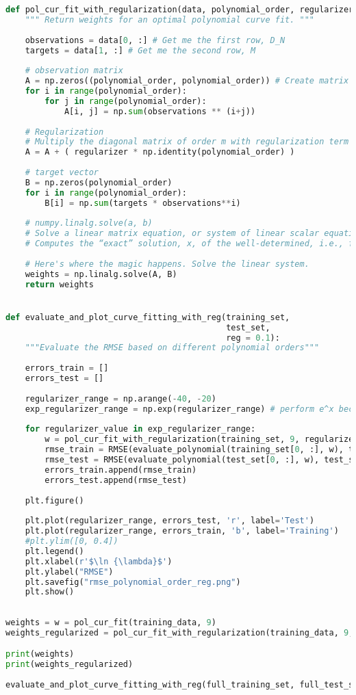 \documentclass[a4paper]{article}
\begin{document}
\begin{lstlisting}[language=Python]
def pol_cur_fit_with_regularization(data, polynomial_order, regularizer = 0.00):
    """ Return weights for an optimal polynomial curve fit. """
    
    observations = data[0, :] # Get me the first row, D_N
    targets = data[1, :] # Get me the second row, M
    
    # observation matrix
    A = np.zeros((polynomial_order, polynomial_order)) # Create matrix
    for i in range(polynomial_order):
        for j in range(polynomial_order):
            A[i, j] = np.sum(observations ** (i+j))
    
    # Regularization
    # Multiply the diagonal matrix of order m with regularization term and add it to A
    A = A + ( regularizer * np.identity(polynomial_order) )
    
    # target vector        
    B = np.zeros(polynomial_order)
    for i in range(polynomial_order):
        B[i] = np.sum(targets * observations**i)
    
    # numpy.linalg.solve(a, b)
    # Solve a linear matrix equation, or system of linear scalar equations.
    # Computes the “exact” solution, x, of the well-determined, i.e., full rank, linear matrix equation ax = b.
    
    # Here's where the magic happens. Solve the linear system.
    weights = np.linalg.solve(A, B)
    return weights


def evaluate_and_plot_curve_fitting_with_reg(training_set, 
                                             test_set,
                                             reg = 0.1):
    """Evaluate the RMSE based on different polynomial orders"""
    
    errors_train = []
    errors_test = []
    
    regularizer_range = np.arange(-40, -20)
    exp_regularizer_range = np.exp(regularizer_range) # perform e^x because Bishop uses ln lambda
    
    for regularizer_value in exp_regularizer_range:
        w = pol_cur_fit_with_regularization(training_set, 9, regularizer_value) # fix polynomial order to 9
        rmse_train = RMSE(evaluate_polynomial(training_set[0, :], w), training_data[1, :])
        rmse_test = RMSE(evaluate_polynomial(test_set[0, :], w), test_set[1, :])
        errors_train.append(rmse_train)
        errors_test.append(rmse_test)
        
    plt.figure()    
        
    plt.plot(regularizer_range, errors_test, 'r', label='Test')
    plt.plot(regularizer_range, errors_train, 'b', label='Training')
    #plt.ylim([0, 0.4])
    plt.legend()
    plt.xlabel(r'$\ln {\lambda}$')
    plt.ylabel("RMSE")
    plt.savefig("rmse_polynomial_order_reg.png")
    plt.show()
        
        
weights = w = pol_cur_fit(training_data, 9)
weights_regularized = pol_cur_fit_with_regularization(training_data, 9, 0.1)

print(weights)
print(weights_regularized)
        
evaluate_and_plot_curve_fitting_with_reg(full_training_set, full_test_set)
\end{lstlisting}
\end{document}
